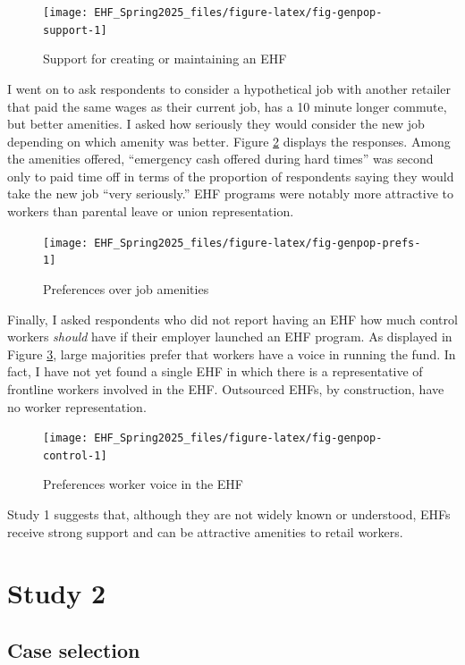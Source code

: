 \documentclass[
  11pt,
  oneside]{article}
\begin{document}
\begin{figure}
\texttt{[image: EHF\_Spring2025\_files/figure-latex/fig-genpop-support-1]} \caption{Support for creating or maintaining  an EHF}\label{fig:fig-genpop-support}
\end{figure}

I went on to ask respondents to consider a hypothetical job with another retailer that paid the same wages as their current job, has a 10 minute longer commute, but better amenities. I asked how seriously they would consider the new job depending on which amenity was better. Figure \ref{fig:fig-genpop-prefs} displays the responses. Among the amenities offered, ``emergency cash offered during hard times'' was second only to paid time off in terms of the proportion of respondents saying they would take the new job ``very seriously.'' EHF programs were notably more attractive to workers than parental leave or union representation.

\begin{figure}
\texttt{[image: EHF\_Spring2025\_files/figure-latex/fig-genpop-prefs-1]} \caption{Preferences over job amenities}\label{fig:fig-genpop-prefs}
\end{figure}

Finally, I asked respondents who did not report having an EHF how much control workers \emph{should} have if their employer launched an EHF program. As displayed in Figure \ref{fig:fig-genpop-control}, large majorities prefer that workers have a voice in running the fund. In fact, I have not yet found a single EHF in which there is a representative of frontline workers involved in the EHF. Outsourced EHFs, by construction, have no worker representation.

\begin{figure}
\texttt{[image: EHF\_Spring2025\_files/figure-latex/fig-genpop-control-1]} \caption{Preferences worker voice in the EHF}\label{fig:fig-genpop-control}
\end{figure}

Study 1 suggests that, although they are not widely known or understood, EHFs receive strong support and can be attractive amenities to retail workers.

\section{Study 2}\label{study-2}

\subsection{Case selection}\label{case-selection}
\end{document}
